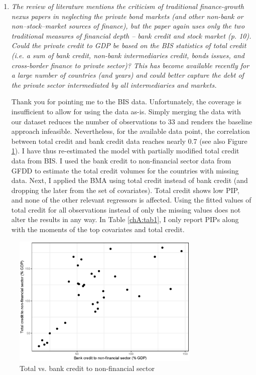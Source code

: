 \begin{enumerate}
    \item \textit{The review of literature mentions the criticism of traditional finance-growth nexus papers in neglecting the private bond markets (and other non-bank or non--stock--market sources of finance), but the paper again uses only the two traditional measures of financial depth -- bank credit and stock market (p. 10). Could the private credit to GDP be based on the BIS statistics of total credit (i.e. a sum of bank credit, non-bank intermediaries credit, bonds issues, and cross-border finance to private sector)? This has become available recently for a large number of countries (and years) and could better capture the debt of the private sector intermediated by all intermediaries and markets.}
    
    Thank you for pointing me to the \ac{BIS} data. Unfortunately, the coverage is insufficient to allow for using the data as-is. Simply merging the data with our dataset reduces the number of observations to 33 and renders the baseline approach infeasible. Nevertheless, for the available data point, the correlation between total credit and bank credit data reaches nearly 0.7 (see also Figure \ref{app:total_bank_credit}). I have thus re-estimated the model with partially modified total credit data from \ac{BIS}. I used the bank credit to non-financial sector data from \ac{GFDD} to estimate the total credit volumes for the countries with missing data. Next, I applied the \ac{BMA} using total credit instead of bank credit (and dropping the later from the set of covariates). Total credit shows low \ac{PIP}, and none of the other relevant regressors is affected. Using the fitted values of total credit for all observations instead of only the missing values does not alter the results in any way. In Table \ref{chA:tab1}, I only report \acp{PIP} along with the moments of the top covariates and total credit.

\end{enumerate}

\begin{figure}[ht!]
  \caption{Total vs. bank credit to non-financial sector}
  \label{app:total_bank_credit}
  \centering
  \includegraphics[width=0.8\textwidth, keepaspectratio]{figures/app/totalcredit_bankcredit}
\end{figure}

